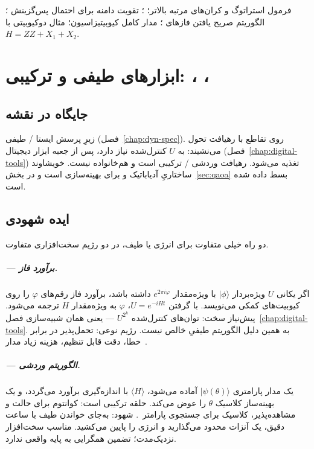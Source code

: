 \begin{remark}
فرمول استراتوگ و کران‌های مرتبه بالاتر؛ ؛ تقویت دامنه برای احتمال پس‌گزینش ؛ الگوریتم صریح یافتن فازهای ؛ مدار کامل کیوبیتیزاسیون؛ مثال دوکیوبیتی با $H=ZZ+X_1+X_2$.
\end{remark}

\chapter{ابزارهای طیفی و ترکیبی: ، ، }
\label{chap:spectral-tools}

\section{جایگاه در نقشه}

زیرِ پرسش ایستا / طیفی (فصل~\ref{chap:dyn-spec}).  روی تقاطع با رهیافت تحول می‌نشیند: به $U$ کنترل‌شده نیاز دارد، پس از جعبه ابزار دیجیتال (فصل~\ref{chap:digital-tools}) تغذیه می‌شود.  رهیافت وردشی / ترکیبی است و هم‌خانواده  نیست.  خویشاوند ساختاریِ آدیاباتیک و  برای بهینه‌سازی  است و در بخش~\ref{sec:qaoa} بسط داده شده است.

\section{ایده شهودی}

دو راه خیلی متفاوت برای انرژی یا طیف، در دو رژیم سخت‌افزاری متفاوت.

\paragraph{ --- برآورد فاز.}
اگر یکانی $U$ ویژه‌بردار $\lvert\phi\rangle$ با ویژه‌مقدار $e^{2\pi i\varphi}$ داشته باشد، برآورد فاز رقم‌های $\varphi$ را روی کیوبیت‌های کمکی می‌نویسد. با گرفتن $U=e^{-iHt}$، $\varphi$ به ویژه‌مقدار $H$ ترجمه می‌شود. پیش‌نیاز سخت: توان‌های کنترل‌شده $U^{2^k}$ --- یعنی همان شبیه‌سازی فصل~\ref{chap:digital-tools}. به همین دلیل  الگوریتم طیفیِ خالص نیست. رژیم نوعی: تحمل‌پذیر در برابر خطا، دقت قابل تنظیم، هزینه زیاد مدار~\cite{NielsenChuang2010,McArdle2020}.

\paragraph{ --- الگوریتم وردشی.}
یک مدار پارامتری $\lvert\psi(\theta)\rangle$ آماده می‌شود، $\langle H\rangle$ با اندازه‌گیری برآورد می‌گردد، و یک بهینه‌ساز کلاسیک $\theta$ را عوض می‌کند. حلقه ترکیبی است: کوانتوم برای حالت و مشاهده‌پذیر، کلاسیک برای جستجوی پارامتر~\cite{Peruzzo2014,Tilly2022}. شهود: به‌جای خواندن طیف با ساعت دقیق، یک آنزات محدود می‌گذارید و انرژی را پایین می‌کشید. مناسب سخت‌افزار نزدیک‌مدت؛ تضمین همگرایی به پایه واقعی ندارد.

